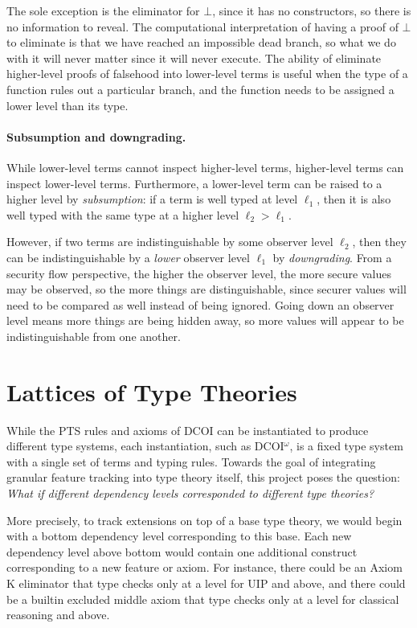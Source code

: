 \documentclass{article}
\begin{document}
The sole exception is the eliminator for $\bot$,
since it has no constructors, so there is no information to reveal.
The computational interpretation of having a proof of $\bot$ to eliminate
is that we have reached an impossible dead branch,
so what we do with it will never matter since it will never execute.
The ability of eliminate higher-level proofs of falsehood into lower-level terms
is useful when the type of a function rules out a particular branch,
and the function needs to be assigned a lower level than its type.

\paragraph{Subsumption and downgrading.}
While lower-level terms cannot inspect higher-level terms,
higher-level terms can inspect lower-level terms.
Furthermore, a lower-level term can be raised to a higher level by \emph{subsumption}:
if a term is well typed at level $\ell_1$,
then it is also well typed with the same type at a higher level $\ell_2 > \ell_1$.

However, if two terms are indistinguishable by some observer level $\ell_2$,
then they can be indistinguishable by a \emph{lower} observer level $\ell_1$ by \emph{downgrading}.
From a security flow perspective, the higher the observer level,
the more secure values may be observed,
so the more things are distinguishable,
since securer values will need to be compared as well instead of being ignored.
Going down an observer level means more things are being hidden away,
so more values will appear to be indistinguishable from one another.

\section{Lattices of Type Theories} \label{sec:lattice}

While the PTS rules and axioms of DCOI can be instantiated to produce different type systems,
each instantiation, such as DCOI$^\omega$,
is a fixed type system with a single set of terms and typing rules.
Towards the goal of integrating granular feature tracking into type theory itself,
this project poses the question:
\emph{What if different dependency levels corresponded to different type theories?}

More precisely, to track extensions on top of a base type theory,
we would begin with a bottom dependency level corresponding to this base.
Each new dependency level above bottom would contain one additional construct
corresponding to a new feature or axiom.
For instance, there could be an Axiom K eliminator that type checks
only at a level for UIP and above,
and there could be a builtin excluded middle axiom that type checks
only at a level for classical reasoning and above.
\end{document}
